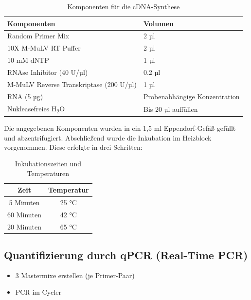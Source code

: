 \documentclass{article}
\begin{document}
\begin{table}[H]
\centering
\begin{tabular}{|l|l|}
\hline
\textbf{Komponenten} & \textbf{Volumen} \\ \hline
Random Primer Mix & 2 µl \\ \hline
10X M-MuLV RT Puffer & 2 µl \\ \hline
10 mM dNTP & 1 µl \\ \hline
RNAse Inhibitor (40 U/µl) & 0.2 µl \\ \hline
M-MuLV Reverse Transkriptase (200 U/µl) & 1 µl \\ \hline
RNA (5 µg) & Probenabhängige Konzentration \\ \hline
Nukleasefreies H\textsubscript{2}O & Bis 20 µl auffüllen \\ \hline
\end{tabular}
\caption{Komponenten für die cDNA-Synthese}
\end{table}

Die angegebenen Komponenten wurden in ein 1,5 ml
Eppendorf-Gefäß gefüllt und abzentrifugiert.
Abschließend wurde die Inkubation im Heizblock vorgenommen.
Diese erfolgte in drei Schritten:

\begin{table}[H]
    \centering
    \begin{tabular}{|c|c|}
    \hline
    \textbf{Zeit} & \textbf{Temperatur} \\ \hline
    5 Minuten & 25 °C \\ \hline
    60 Minuten & 42 °C \\ \hline
    20 Minuten & 65 °C \\ \hline
    \end{tabular}
    \caption{Inkubationszeiten und Temperaturen}
    \end{table}

\subsection{Quantifizierung durch qPCR (Real-Time PCR)}

\begin{itemize}
    \item 3 Mastermixe erstellen (je Primer-Paar)
    \item PCR im Cycler
\end{itemize}
\end{document}

